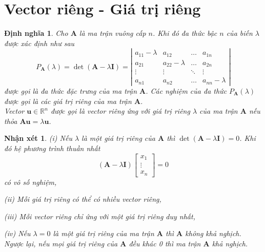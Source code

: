 \documentclass[12pt,a4paper,oneside]{report}
\newtheorem{nx}{Nhận xét}[section]
\newtheorem{dn}{Định nghĩa}[section]
\numberwithin{equation}{section}
\begin{document}
\section{Vector riêng - Giá trị riêng}
\begin{dn}\cite{thuan2003}
 Cho $\mathbf{A}$ là ma trận vuông cấp $n$. Khi đó đa thức bậc $n$ của biến $\lambda$ được xác định như sau
 $$
 P_{\mathbf{A}}(\lambda)=\operatorname{det}(\mathbf{A}-\lambda \mathbf{I})=\left|\begin{array}{cccc}
 	a_{11}-\lambda & a_{12} & \ldots & a_{1 n} \\
 	a_{21} & a_{22}-\lambda & \ldots & a_{2 n} \\
 	\vdots & \vdots & \ddots & \vdots \\
 	a_{n 1} & a_{n 2} & \ldots & a_{n n}-\lambda
 \end{array}\right|
 $$
được gọi là đa thức đặc trưng của ma trận $\mathbf{A}$. Các nghiệm của đa thức $P_{\mathbf{A}}(\lambda)$ được gọi là các giá trị riêng của ma trận $\mathbf{A}$.\\
Vector $\mathbf{u} \in \mathbb{R}^{n}$ được gọi là vector riêng ứng với giá trị riêng $\lambda$ của ma trận $\mathbf{A}$ nếu thỏa $\mathbf{A u}=\lambda \mathbf{u}$.
\end{dn}
\begin{nx}
 \item[(i)] Nếu $\lambda$ là một giá trị riêng của $\mathbf{A}$ thì $\operatorname{det}(\mathbf{A}-\lambda \mathbf{I})=0$. Khi đó hệ phương trình thuần nhất 
 $$
 (\mathbf{A}-\lambda \mathbf{I})\left[\begin{array}{c}
 	x_{1} \\
 	\vdots \\
 	x_{n}
 \end{array}\right]=0
 $$
 có vô số nghiệm,
 
 \item[(ii)] Mỗi giá trị riêng có thể có nhiều vector riêng,
 
 \item[(iii)] Mỗi vector riêng chỉ ứng với một giá trị riêng duy nhất,
 
 \item[(iv)] Nếu $\lambda=0$ là một giá trị riêng của ma trận $\mathbf{A}$ thì $\mathbf{A}$ không khả nghịch. Ngược lại, nếu mọi giá trị riêng của $\mathbf{A}$ đều khác 0 thì ma trận $\mathbf{A}$ khả nghịch. 
\end{nx}
\end{document}

